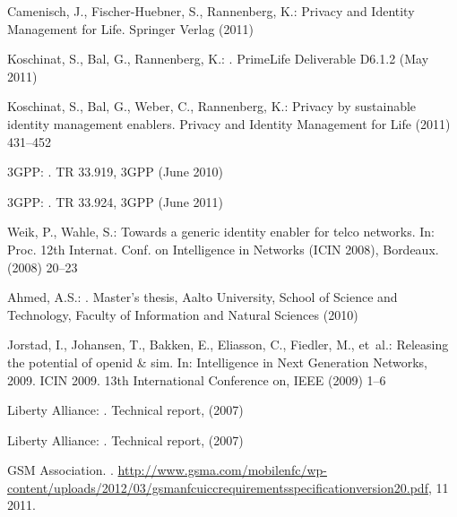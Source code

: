 \documentclass[runningheads,a4paper]{llncs}
\begin{document}
\begin{thebibliography}{10}
Camenisch, J., Fischer-Huebner, S., Rannenberg, K.:
\newblock Privacy and Identity Management for Life.
\newblock Springer Verlag (2011)

Koschinat, S., Bal, G., Rannenberg, K.:
.
\newblock PrimeLife Deliverable D6.1.2 (May 2011)

Koschinat, S., Bal, G., Weber, C., Rannenberg, K.:
\newblock Privacy by sustainable identity management enablers.
\newblock Privacy and Identity Management for Life (2011)  431--452


3GPP:
.
\newblock TR {33.919}, {3GPP} (June 2010)

3GPP:
.
\newblock TR {33.924}, {3GPP} (June 2011)

Weik, P., Wahle, S.:
\newblock Towards a generic identity enabler for telco networks.
\newblock In: Proc. 12th Internat. Conf. on Intelligence in Networks (ICIN
  2008), Bordeaux. (2008)  20--23
  


Ahmed, A.S.:
.
\newblock Master's thesis, Aalto University, School of Science and Technology,
  Faculty of Information and Natural Sciences (2010)
  
Jorstad, I., Johansen, T., Bakken, E., Eliasson, C., Fiedler, M.,  et~al.:
\newblock Releasing the potential of openid \& sim.
\newblock In: Intelligence in Next Generation Networks, 2009. ICIN 2009. 13th
  International Conference on, IEEE (2009)  1--6
  

{Liberty Alliance}:
.
\newblock Technical report, (2007)

{Liberty Alliance}:
.
\newblock Technical report, (2007)


GSM Association.
.
\newblock
  \url{http://www.gsma.com/mobilenfc/wp-content/uploads/2012/03/gsmanfcuiccrequirementsspecificationversion20.pdf},
  11 2011.


\end{thebibliography}
\end{document}
